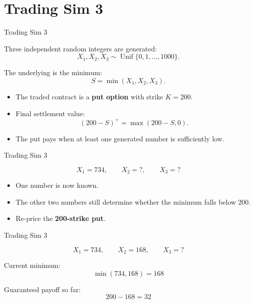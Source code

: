 \section{Trading Sim 3}

\begin{frame}{Trading Sim 3}
  \begin{sqt:definition}
    Three independent random integers are generated:
    \[
      X_1,X_2,X_3 \sim \operatorname{Unif}\{0,1,\ldots,1000\}.
    \]

    The underlying is the minimum:
    \[
      S=\min(X_1,X_2,X_3).
    \]
  \end{sqt:definition}

  \begin{itemize}
    \item The traded contract is a \textbf{put option} with strike $K=200$.
    \item Final settlement value:
      \[
        (200-S)^+ = \max(200-S,0).
      \]
    \item The put pays when at least one generated number is sufficiently low.
  \end{itemize}

\end{frame}

\begin{frame}{Trading Sim 3}
  \begin{center}
    \[
      X_1=734,\qquad X_2=?,\qquad X_3=?
    \]
  \end{center}

  \begin{itemize}
    \item One number is now known.
    \item The other two numbers still determine whether the minimum falls below $200$.
    \item Re-price the \textbf{200-strike put}.
  \end{itemize}
\end{frame}

\begin{frame}{Trading Sim 3}
  \begin{center}
    \[
      X_1=734,\qquad X_2=168,\qquad X_3=?
    \]

    \vspace{0.2cm}
    Current minimum:
    \[
      \min(734,168)=168
    \]

    \vspace{0.2cm}
    Guaranteed payoff so far:
    \[
      200-168=32
    \]
  \end{center}
\end{frame}


